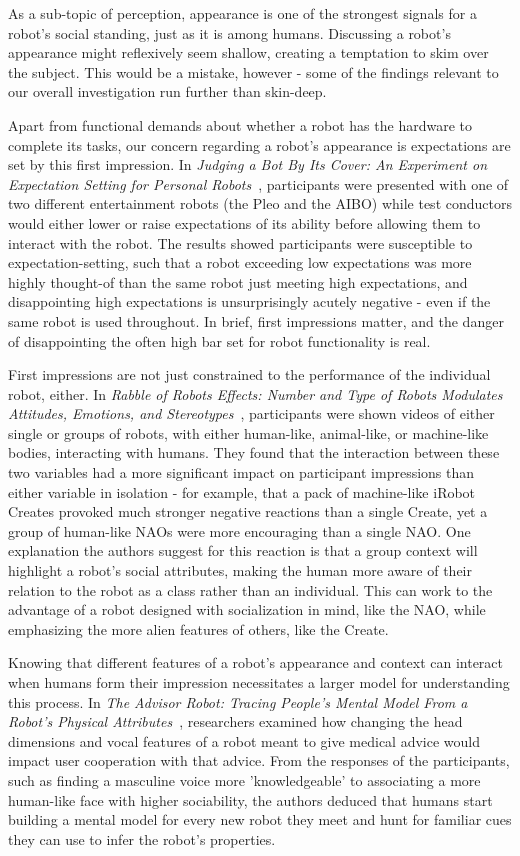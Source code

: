 \documentclass{sfuthesis}
\begin{document}
As a sub-topic of perception, appearance is one of the strongest signals for a robot's social standing, just as it is among humans. Discussing a robot's appearance might reflexively seem shallow, creating a temptation to skim over the subject. This would be a mistake, however - some of the findings relevant to our overall investigation run further than skin-deep.

Apart from functional demands about whether a robot has the hardware to complete its tasks, our concern regarding a robot's appearance is expectations are set by this first impression. In \textit{Judging a Bot By Its Cover: An Experiment on Expectation Setting for Personal Robots}~\cite{paepcke2010judging}, participants were presented with one of two different entertainment robots (the Pleo and the AIBO) while test conductors would either lower or raise expectations of its ability before allowing them to interact with the robot. The results showed participants were susceptible to expectation-setting, such that a robot exceeding low expectations was more highly thought-of than the same robot just meeting high expectations, and disappointing high expectations is unsurprisingly acutely negative - even if the same robot is used throughout. In brief, first impressions matter, and the danger of disappointing the often high bar set for robot functionality is real.

First impressions are not just constrained to the performance of the individual robot, either. In \textit{Rabble of Robots Effects: Number and Type of Robots Modulates Attitudes, Emotions, and Stereotypes}~\cite{fraune2015rabble}, participants were shown videos of either single or groups of robots, with either human-like, animal-like, or machine-like bodies, interacting with humans. They found that the interaction between these two variables had a more significant impact on participant impressions than either variable in isolation - for example, that a pack of machine-like iRobot Creates provoked much stronger negative reactions than a single Create, yet a group of human-like NAOs were more encouraging than a single NAO. One explanation the authors suggest for this reaction is that a group context will highlight a robot's social attributes, making the human more aware of their relation to the robot as a class rather than an individual. This can work to the advantage of a robot designed with socialization in mind, like the NAO, while emphasizing the more alien features of others, like the Create.

Knowing that different features of a robot's appearance and context can interact when humans form their impression necessitates a larger model for understanding this process. In \textit{The Advisor Robot: Tracing People's Mental Model From a Robot's Physical Attributes}~\cite{powers2006advisor}, researchers examined how changing the head dimensions and vocal features of a robot meant to give medical advice would impact user cooperation with that advice. From the responses of the participants, such as finding a masculine voice more 'knowledgeable' to associating a more human-like face with higher sociability, the authors deduced that humans start building a mental model for every new robot they meet and hunt for familiar cues they can use to infer the robot's properties.
\end{document}
